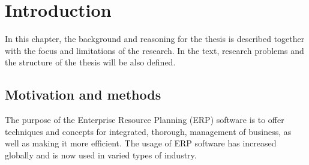 \documentclass[12pt,a4paper,oneside,pdftex]{report}
\begin{document}
\cleardoublepage
\tableofcontents



\label{pages-prelude}
\cleardoublepage

\startfirstchapter

\pagestyle{headings}


% 

\chapter{Introduction}
\label{chapter:introduction}
In this chapter, the background and reasoning for the thesis is described together with the focus and limitations of the research. In the text, research problems and the structure of the thesis will be also defined.

\section{Motivation and methods}
\label{sec:motivation}
The purpose of the Enterprise Resource Planning (ERP) software is to offer techniques and concepts for integrated, thorough, management of business, as well as making it more efficient. The usage of ERP software has increased globally and is now used in varied types of industry.\cite{erp1} 
\end{document}
